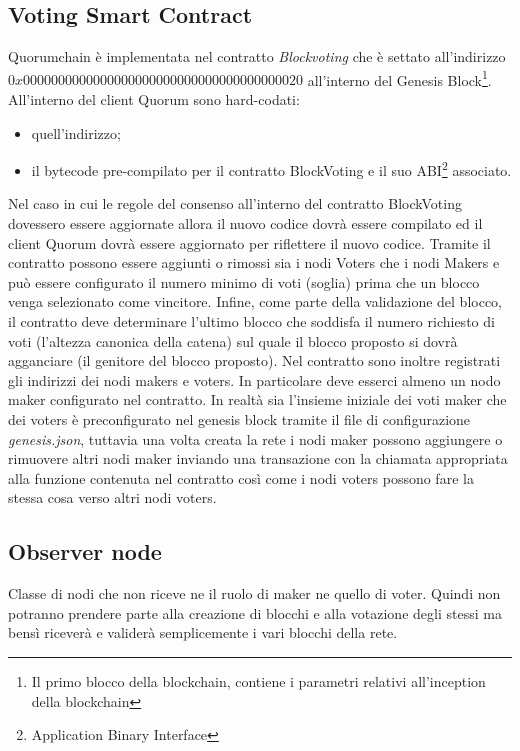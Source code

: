 \subsection{Voting Smart Contract}
%
Quorumchain è implementata nel contratto \emph{Blockvoting} che è settato all'indirizzo $0x0000000000000000000000000000000000000020$ all'interno del Genesis Block\footnote{Il primo blocco della blockchain, contiene i parametri relativi all'inception della blockchain}. All'interno del client Quorum sono hard-codati:
\begin{itemize}
	\item quell'indirizzo;
	\item il bytecode pre-compilato per il contratto BlockVoting e il suo ABI\footnote{Application Binary Interface} associato.
\end{itemize}
Nel caso in cui le regole del consenso all'interno del contratto BlockVoting dovessero essere aggiornate allora il nuovo codice dovrà essere compilato ed il client Quorum dovrà essere aggiornato per riflettere il nuovo codice. Tramite il contratto possono essere aggiunti o rimossi sia i nodi Voters che i nodi Makers e può essere configurato il numero minimo di voti (soglia) prima che un blocco venga selezionato come vincitore. Infine, come parte della validazione del blocco, il contratto deve determinare l'ultimo blocco che soddisfa il numero richiesto di voti (l'altezza canonica della catena) sul quale il blocco proposto si dovrà agganciare (il genitore del blocco proposto). Nel contratto sono inoltre registrati gli indirizzi dei nodi makers e voters. In particolare deve esserci almeno un nodo maker configurato nel contratto. In realtà sia l'insieme iniziale dei voti maker che dei voters è preconfigurato nel genesis block tramite il file di configurazione \emph{genesis.json}, tuttavia una volta creata la rete i nodi maker possono aggiungere o rimuovere altri nodi maker inviando una transazione con la chiamata appropriata alla funzione contenuta nel contratto così come i nodi voters possono fare la stessa cosa verso altri nodi voters. %
\subsection{Observer node}%
Classe di nodi che non riceve ne il ruolo di maker ne quello di voter. Quindi non potranno prendere parte alla creazione di blocchi e alla votazione degli stessi ma bensì riceverà e validerà semplicemente i vari blocchi della rete.%
